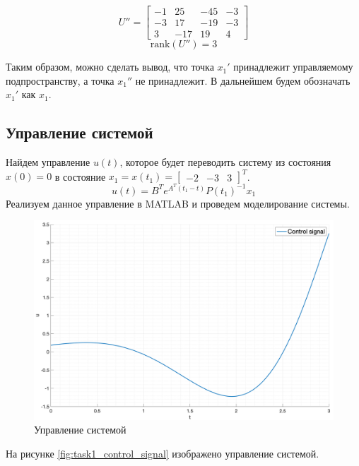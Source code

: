 \begin{equation}
   U'' = \begin{bmatrix}
        -1 & 25 & -45 & -3 \\
        -3 & 17 & -19 & -3 \\
        3 & -17 & 19 & 4
    \end{bmatrix}
\end{equation}
\begin{equation}
    \text{rank}(U'') = 3
\end{equation}

Таким образом, можно сделать вывод, что точка $x_1'$ принадлежит управляемому подпространству, а точка $x_1''$ не принадлежит. В дальнейшем будем обозначать $x_1'$ как $x_1$.

\subsection{Управление системой}
Найдем управление $u(t)$, которое будет переводить систему из состояния $x(0) = 0$ в состояние $x_1 = x(t_1) = \begin{bmatrix} -2 & -3 & 3 \end{bmatrix}^T$. 
\begin{equation}
    u(t) = B^Te^{A^T(t_1 - t)}P(t_1)^{-1}x_1
\end{equation}
Реализуем данное управление в MATLAB и проведем моделирование системы.  
\begin{figure}
    \centering
    \includegraphics[width=\textwidth]{media/plots/task2_control_signal.png}
    \caption{Управление системой}
    \label{fig:task2_control_signal}
\end{figure}
На рисунке \ref{fig:task1_control_signal} изображено управление системой.
